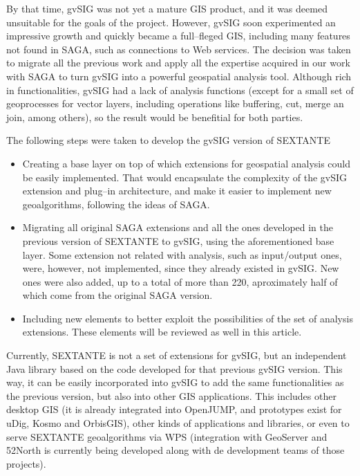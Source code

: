 \documentclass[12pt,a4paper,twocolumn]{article}
\begin{document}
By that time, gvSIG was not yet a mature GIS product, and it was deemed unsuitable for the goals of the project. However, gvSIG soon experimented an impressive growth and quickly became a full--fleged GIS, including many features not found in SAGA, such as connections to Web services. The decision was taken to migrate all the previous work and apply all the expertise acquired in our work with SAGA to turn gvSIG into a powerful geospatial analysis tool. Although rich in functionalities, gvSIG had a lack of analysis functions (except for a small set of geoprocesses for vector layers, including operations like buffering, cut, merge an join, among others), so the result would be benefitial for both parties.

The following steps were taken to develop the gvSIG version of SEXTANTE

\begin{itemize}
	\item Creating a base layer on top of which extensions for geospatial analysis could be easily implemented. That would encapsulate the complexity of the gvSIG extension and plug--in architecture, and make it easier to implement new geoalgorithms, following the ideas of SAGA.
	\item Migrating all original SAGA extensions and all the ones developed in the previous version of SEXTANTE to gvSIG, using the aforementioned base layer. Some extension not related with analysis, such as input/output ones, were, however, not implemented, since they already existed in gvSIG. New ones were also added, up to a total of more than 220, aproximately half of which come from the original SAGA version.
	\item Including new elements to better exploit the possibilities of the set of analysis extensions. These elements will be reviewed as well in this article.
\end{itemize}

Currently, SEXTANTE is not a set of extensions for gvSIG, but an independent Java library based on the code developed for that previous gvSIG version. This way, it can be easily incorporated into gvSIG to add the same functionalities as the previous version, but also into other GIS applications. This includes other desktop GIS (it is already integrated into OpenJUMP, and prototypes exist for uDig, Kosmo and OrbisGIS), other kinds of applications and libraries, or even to serve SEXTANTE geoalgorithms via WPS (integration with GeoServer and 52North is currently being developed along with de development teams of those projects).
\end{document}
